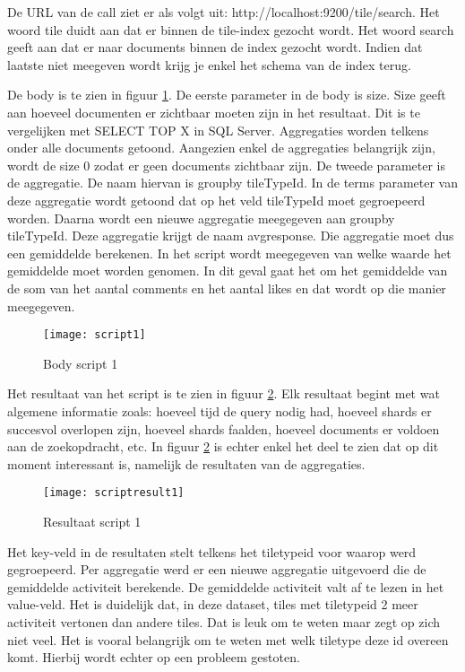 De URL van de call ziet er als volgt uit: http://localhost:9200/tile/\textunderscore search. Het woord tile duidt aan dat er binnen de tile-index gezocht wordt. Het woord \textunderscore search geeft aan dat er naar documents binnen de index gezocht wordt. Indien dat laatste niet meegeven wordt krijg je enkel het schema van de index terug.

De body is te zien in figuur \ref{fig:script1}. De eerste parameter in de body is size. Size geeft aan hoeveel documenten er zichtbaar moeten zijn in het resultaat. Dit is te vergelijken met SELECT TOP X in SQL Server. Aggregaties worden telkens onder alle documents getoond. Aangezien enkel de aggregaties belangrijk zijn, wordt de size 0 zodat er geen documents zichtbaar zijn. De tweede parameter is de aggregatie. De naam hiervan is group\textunderscore by \textunderscore tileTypeId. In de terms parameter van deze aggregatie wordt getoond dat op het veld tileTypeId moet gegroepeerd worden. Daarna wordt een nieuwe aggregatie meegegeven aan group\textunderscore by \textunderscore tileTypeId. Deze aggregatie krijgt de naam avg\textunderscore response. Die aggregatie moet dus een gemiddelde berekenen. In het script wordt meegegeven van welke waarde het gemiddelde moet worden genomen. In dit geval gaat het om het gemiddelde van de som van het aantal comments en het aantal likes en dat wordt op die manier meegegeven.

\begin{figure}
	\centering
	\texttt{[image: script1]}
	\caption{Body script 1}
	\label{fig:script1}
\end{figure}

Het resultaat van het script is te zien in figuur \ref{fig:scriptresult1}. Elk resultaat begint met wat algemene informatie zoals: hoeveel tijd de query nodig had, hoeveel shards er succesvol overlopen zijn, hoeveel shards faalden, hoeveel documents er voldoen aan de zoekopdracht, etc. In figuur \ref{fig:scriptresult1} is echter enkel het deel te zien dat op dit moment interessant is, namelijk de resultaten van de aggregaties.

\begin{figure}
	\centering
	\texttt{[image: scriptresult1]}
	\caption{Resultaat script 1}
	\label{fig:scriptresult1}
\end{figure}

Het key-veld in de resultaten stelt telkens het tiletypeid voor waarop werd gegroepeerd. Per aggregatie werd er een nieuwe aggregatie uitgevoerd die de gemiddelde activiteit berekende. De gemiddelde activiteit valt af te lezen in het value-veld. Het is duidelijk dat, in deze dataset, tiles met tiletypeid 2 meer activiteit vertonen dan andere tiles. Dat is leuk om te weten maar zegt op zich niet veel. Het is vooral belangrijk om te weten met welk tiletype deze id overeen komt. Hierbij wordt echter op een probleem gestoten.


